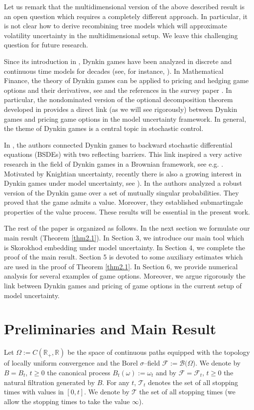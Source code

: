 \documentclass{amsart}
\numberwithin{equation}{section}
\begin{document}
Let us remark that the multidimensional version of the above described result is an open question which requires
a completely different approach. In particular, it is not clear how to derive recombining tree models
which will approximate volatility uncertainty in the multidimensional setup.
We leave this challenging question for future research.

Since its introduction in \cite{Dyn}, Dynkin games have been analyzed in discrete and continuous time
models for decades (see, for instance, \cite{BF,BS,LM,N,O}).
In Mathematical Finance, the theory of Dynkin games can be applied to pricing and hedging game options
and their derivatives, see \cite{D,HZ,K,KK,MC}
and the references in the survey paper \cite{Ki}.
In particular, the
nondominated version of the optional decomposition
theorem developed in \cite{Nu} provides a direct link
(as we will
see rigorously)
between Dynkin games and
pricing game options in the model uncertainty
framework.
In general, the theme of Dynkin games
is a central topic in stochastic control.

In \cite{CK}, the authors connected
Dynkin games to
backward stochastic differential equations (BSDEs)
with two reflecting barriers. This link inspired a very active
research in the field of Dynkin games in a Brownian framework,
see e.g. \cite{BL,BY1,H,HH1,HH,X}.
Motivated by Knightian uncertainty, recently there is also
a growing interest in Dynkin games under model uncertainty, see \cite{BY,D,HH,Y}).
In \cite{BY} the authors analyzed a robust version of the Dynkin game over a set of mutually singular probabilities.
They proved that the game admits a value. Moreover, they established submartingale properties of the value process. These
results will be essential in the present work.

The rest of the paper is organized as follows. In the next section we formulate our main result (Theorem \ref{thm2.1}).
In Section 3, we introduce our main tool which is Skorokhod embedding under model uncertainty.
In Section 4, we complete the proof of the main result. Section 5 is devoted to some
auxiliary estimates which are used in the proof of Theorem \ref{thm2.1}.
In Section 6, we provide numerical analysis
for several examples of game options. Moreover, we argue rigorously
the link between Dynkin games and pricing of game options
in the current setup of model uncertainty.

\section{Preliminaries and Main Result}\label{sec:2}\setcounter{equation}{0}
Let $\Omega:=C(\mathbb R_{+}, \mathbb R)$
be the space of
continuous paths equipped with the topology of locally uniform convergence
and the Borel $\sigma$--field $\mathcal F:=\mathcal B(\Omega$). We denote by $B=B_t$, $t\geq 0$
the canonical process $ B_t(\omega):=\omega_t$ and by $\mathcal F=\mathcal F_t$, $t\geq 0$
the natural filtration generated by
$B$.
For any $t$, $\mathcal T_t$ denotes the set of all stopping times with values in $[0,t]$. We denote
by $\mathcal T$ the set of all stopping times (we allow the stopping times to take the value $\infty$).
\end{document}
